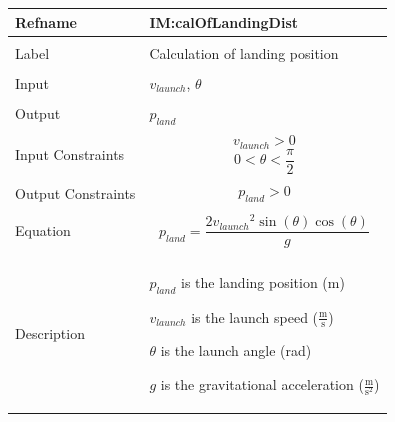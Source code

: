 \documentclass[12pt]{article}
\begin{document}
\noindent \begin{minipage}{\textwidth}
          \begin{tabular}{>{\raggedright}p{}>{\raggedright\arraybackslash}p{}}
          \toprule \textbf{Refname} & \textbf{IM:calOfLandingDist}
          \label{IM:calOfLandingDist}
          \\ \midrule \\
          Label & Calculation of landing position
          \\ \midrule \\
          Input & ${v_{launch}}$, $θ$
          \\ \midrule \\
          Output & ${p_{land}}$
          \\ \midrule \\
          Input Constraints & \begin{displaymath}
                              {v_{launch}}>0
                              \end{displaymath}
                              \begin{displaymath}
                              0<θ<\frac{π}{2}
                              \end{displaymath}
          \\ \midrule \\
          Output Constraints & \begin{displaymath}
                               {p_{land}}>0
                               \end{displaymath}
          \\ \midrule \\
          Equation & \begin{displaymath}
                     {p_{land}}=\frac{2 {v_{launch}}^{2} \sin\left(θ\right) \cos\left(θ\right)}{g}
                     \end{displaymath}
          \\ \midrule \\
          Description & \begin{symbDescription}
                        \item{${p_{land}}$ is the landing position (m)}
                        \item{${v_{launch}}$ is the launch speed ($\frac{\text{m}}{\text{s}}$)}
                        \item{$θ$ is the launch angle (rad)}
                        \item{$g$ is the gravitational acceleration ($\frac{\text{m}}{\text{s}^{2}}$)}

\end{symbDescription}
\end{tabular}
\end{minipage}
\end{document}
